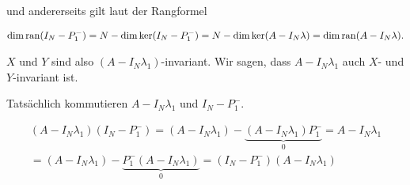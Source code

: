 \begin{remark}
    und andererseits gilt laut der Rangformel

    \begin{align*}
        \dim \operatorname{ran} (I_N - P_1^-)
        =
        N - \dim \ker (I_N - P_1^-)
        =
        N - \dim \ker (A - I_N \lambda)
        =
        \dim \operatorname{ran} (A - I_N \lambda).
    \end{align*}

    $X$ und $Y$ sind also $(A - I_N \lambda_1)$-invariant.
    Wir sagen, dass $A - I_N \lambda_1$ auch $X$- und $Y$-invariant ist.

    Tatsächlich kommutieren $A - I_N \lambda_1$ und $I_N - P_1^-$.

    \begin{multline*}
        (A - I_N \lambda_1) (I_N - P_1^-)
        =
        (A - I_N \lambda_1) - \underbrace{(A - I_N \lambda_1) P_1^-}_0
        =
        A - I_N \lambda_1 \\
        =
        (A - I_N \lambda_1) - \underbrace{P_1^- (A - I_N \lambda_1)}_0
        =
        (I_N - P_1^-) (A - I_N \lambda_1)
    \end{multline*}

\end{remark}
